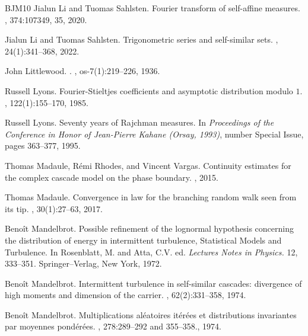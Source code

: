 \documentclass[12pt]{amsart}
\theoremstyle{definition}
\theoremstyle{remark}
\numberwithin{equation}{section}
\begin{document}
\begin{thebibliography}{BJM10}
	Jialun Li and Tuomas Sahlsten.
	\newblock Fourier transform of self-affine measures.
	, 374:107349, 35, 2020.
	
	Jialun Li and Tuomas Sahlsten.
	\newblock Trigonometric series and self-similar sets.
	, 24(1):341--368, 2022.
	
	John Littlewood.
	.
	, os-7(1):219--226, 1936.
	
	
	
	Russell Lyons.
	\newblock Fourier-{S}tieltjes coefficients and asymptotic distribution modulo
	{$1$}.
	, 122(1):155--170, 1985.
	
	Russell Lyons.
	\newblock Seventy years of {R}ajchman measures.
	\newblock In {\em Proceedings of the {C}onference in {H}onor of {J}ean-{P}ierre
		{K}ahane ({O}rsay, 1993)}, number Special Issue, pages 363--377, 1995.
	
	
	Thomas Madaule, Rémi Rhodes, and Vincent Vargas. 
	\newblock Continuity estimates for the complex cascade model on the phase boundary.
	, 2015.
	
	
	Thomas Madaule.
	\newblock Convergence in law for the branching random walk seen from its tip.
	, 30(1):27--63, 2017.
	
	
	
	
	
	Beno\^{i}t Mandelbrot.
	\newblock Possible refinement of the lognormal hypothesis concerning
	the distribution of energy in intermittent turbulence, Statistical Models and
	Turbulence. 
	\newblock In Rosenblatt, M. and Atta, C.V. ed. {\em Lectures Notes in Physics.}
	12, 333–351. Springer–Verlag, New York, 1972.
	
	
	Beno\^{i}t Mandelbrot.
	\newblock Intermittent turbulence in self-similar cascades: divergence of high
	moments and dimension of the carrier.
	, 62(2):331–358, 1974.
	
	Beno\^{i}t Mandelbrot.
	\newblock Multiplications aléatoires itérées et distributions invariantes par moyennes pondérées.
	, 278:289–292 and 355–358., 1974.
	

\end{thebibliography}
\end{document}
